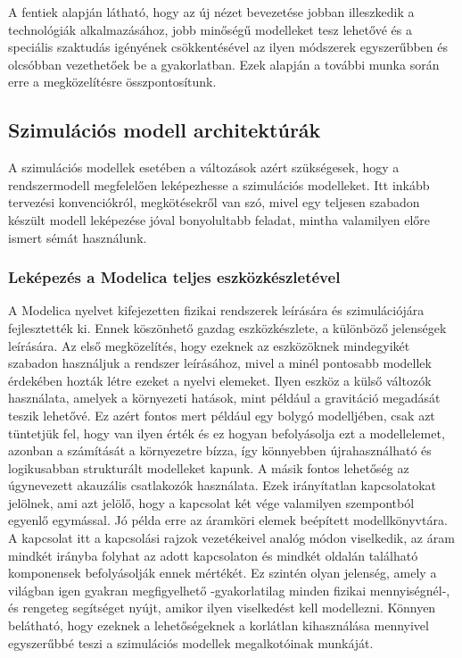         A fentiek alapján látható, hogy az új nézet bevezetése jobban illeszkedik a technológiák alkalmazásához, jobb minőségű modelleket tesz lehetővé és a speciális szaktudás igényének csökkentésével az ilyen módszerek egyszerűbben és olcsóbban vezethetőek be a gyakorlatban.
        Ezek alapján a további munka során erre a megközelítésre összpontosítunk.

    \subsection{Szimulációs modell architektúrák}
        A szimulációs modellek esetében a változások azért szükségesek, hogy a rendszermodell megfelelően leképezhesse a szimulációs modelleket.
        Itt inkább tervezési konvenciókról, megkötésekről van szó, mivel egy teljesen szabadon készült modell leképezése jóval bonyolultabb feladat, mintha valamilyen előre ismert sémát használunk.

        \subsubsection{Leképezés a Modelica teljes eszközkészletével}
            A Modelica nyelvet kifejezetten fizikai rendszerek leírására és szimulációjára fejlesztették ki.
            Ennek köszönhető gazdag eszközkészlete, a különböző jelenségek leírására.
            Az első megközelítés, hogy ezeknek az eszközöknek mindegyikét szabadon használjuk a rendszer leírásához, mivel a minél pontosabb modellek érdekében hozták létre ezeket a nyelvi elemeket.
            Ilyen eszköz a külső változók használata, amelyek a környezeti hatások, mint például a gravitáció megadását teszik lehetővé. Ez azért fontos mert például egy bolygó modelljében, csak azt tüntetjük fel, hogy van ilyen érték és ez hogyan befolyásolja ezt a modellelemet, azonban a számítását a környezetre bízza, így könnyebben újrahasználható és logikusabban strukturált modelleket kapunk.
            A másik fontos lehetőség az úgynevezett akauzális csatlakozók használata. Ezek irányítatlan kapcsolatokat jelölnek, ami azt jelölő, hogy a kapcsolat két vége valamilyen szempontból egyenlő egymással. Jó példa erre az áramköri elemek beépített modellkönyvtára. A kapcsolat itt a kapcsolási rajzok vezetékeivel analóg módon viselkedik, az áram mindkét irányba folyhat az adott kapcsolaton és mindkét oldalán található komponensek befolyásolják ennek mértékét.
            Ez szintén olyan jelenség, amely a világban igen gyakran megfigyelhető -gyakorlatilag minden fizikai mennyiségnél-, és rengeteg segítséget nyújt, amikor ilyen viselkedést kell modellezni.
            Könnyen belátható, hogy ezeknek a lehetőségeknek a korlátlan kihasználása mennyivel egyszerűbbé teszi a szimulációs modellek megalkotóinak munkáját.

